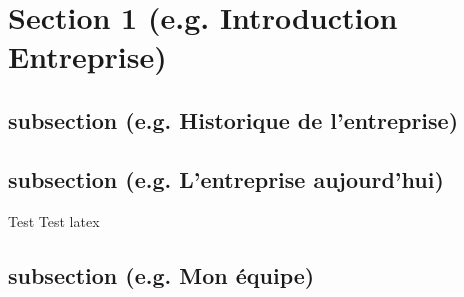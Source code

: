 \section{Section 1 (e.g. Introduction Entreprise)}

\lipsum[1]

\subsection{subsection (e.g. Historique de l'entreprise)}

\lipsum[2]

\subsection{subsection (e.g.  L'entreprise aujourd'hui)}

\lipsum[2]

Test Test \Gls{latex}

\subsection{subsection (e.g. Mon équipe)}

\lipsum[2]